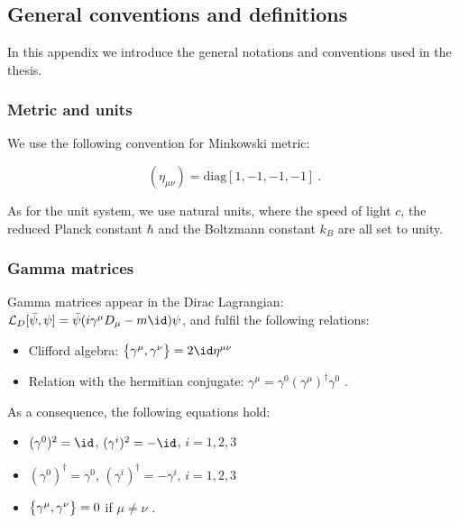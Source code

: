 \appendix
\label{AP}

\chapter{}

\section{General conventions and definitions}

In this appendix we introduce the general notations and conventions used in the thesis. 

\subsection{Metric and units}

We use the following convention for Minkowski metric:

\begin{equation}
(\eta_{\mu\nu}) = \mathrm{diag}[1,-1,-1,-1] \: .
\label{metric}
\end{equation}

As for the unit system, we use natural units, where the speed of light $c$, the reduced Planck constant $\hbar$ and the Boltzmann constant $k_B$ are all set to unity.

\subsection{Gamma matrices}
\label{gamma_matrices}

Gamma matrices appear in the Dirac Lagrangian: $\Lag_D [\bar \psi, \psi] = \bar \psi (i \gamma^{\mu} D_{\mu} -m \id) \psi$, and fulfil the following relations:

\begin{itemize}
\item Clifford algebra: $\qty \big{\gamma^{\mu}, \gamma^{\nu}} = 2 \id \eta^{\mu \nu}$
\item Relation with the hermitian conjugate: $\gamma^{\mu} = \gamma^0 (\gamma^{\mu})^{\dagger} \gamma^0$ \: .
\end{itemize}
%
As a consequence, the following equations hold:
\begin{itemize}
\item $(\gamma^0)^2 = \id$, $(\gamma^i)^2 = - \id$, $i= 1,2,3$
\item $(\gamma^0)^{\dagger} = \gamma^0$, $(\gamma^i)^{\dagger} = -\gamma^i$, $i= 1,2,3$
\item $\qty \big{\gamma^{\mu}, \gamma^{\nu}} = 0$ if $\mu \neq \nu$ \: .
\end{itemize}

